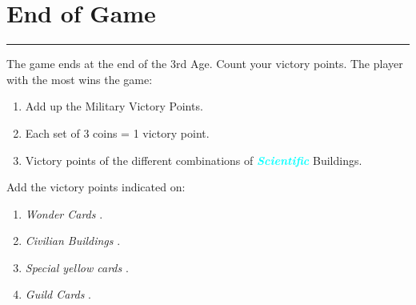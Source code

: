 \documentclass{scrartcl}%
\begin{document}
\section{ End of Game
}%
\label{sec:EndofGame}%
\textcolor{cyan}{\rule{18cm}{0.07cm}}\break%
The game ends at the end of the 3rd Age. Count your victory points. The player with the most wins the game:
%
\begin{enumerate}%
\item%
%
 Add up the Military Victory Points.
%
\item%
%
 Each set of 3 coins = 1 victory point.
%
\item%
%
 Victory points of the different combinations of %
\textcolor{cyan}{\textbf{\textit{Scientific}}}%
\textit{ }%
 Buildings.
%
\end{enumerate}%
Add the victory points indicated on:
%
\begin{enumerate}%
\item%
%
\textit{Wonder Cards}%
.
%
\item%
%
\textit{Civilian Buildings}%
.
%
\item%
%
\textit{Special yellow cards}%
.
%
\item%
%
\textit{Guild Cards}%
.%
\end{enumerate}

%
\end{document}
